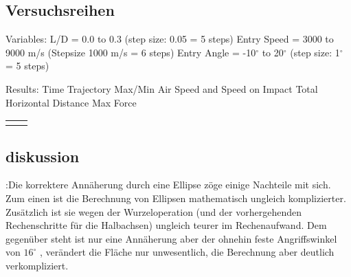 \subsection{Versuchsreihen}
Variables:
L/D = 0.0 to 0.3 (step size: 0.05 = 5 steps)
Entry Speed = 3000 to 9000 m/s  (Stepsize 1000 m/s = 6 steps)
Entry Angle = -10$^{\circ}$ to 20$^{\circ}$ (step size: 1$^{\circ}$ = 5 steps) 

Results:
Time
Trajectory
Max/Min Air Speed and Speed on Impact
Total Horizontal Distance
Max Force

\begin{tabular}{|c|c|}
	\hline 
	&  \\ 
	\hline 
	&  \\ 
	\hline 
\end{tabular} 


\subsection{diskussion} :Die korrektere Annäherung durch eine Ellipse zöge einige Nachteile mit sich. Zum einen ist die Berechnung von Ellipsen mathematisch ungleich komplizierter. Zusätzlich ist sie wegen der Wurzeloperation (und der vorhergehenden Rechenschritte für die Halbachsen) ungleich teurer im Rechenaufwand. Dem gegenüber steht ist nur eine Annäherung aber der ohnehin feste Angriffswinkel von $16^{\circ}$ \cite{Edquist2009}, verändert die Fläche nur unwesentlich, die Berechnung aber deutlich verkompliziert.